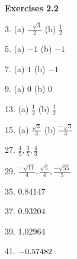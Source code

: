 \textbf{Exercises 2.2} 
\begin{multicols}{2}

3.
(a) $\frac{ -\sqrt{3}}{2}$ (b) $\frac{1}{2}$ 

5. (a) $ -1$ (b) $ -1$ 

7. (a) $1$ (b) $ -1$ 

9. (a) $0$ (b) $0$ 

13. (a) $\frac{1}{2}$ (b) $\frac{1}{2}$ 

15. (a) $\frac{\sqrt{3}}{3}$ (b) $\frac{ -\sqrt{3}}{3}$ 

27. $\frac{4}{5} ,\frac{3}{5} ,\frac{4}{3}$ 

29. $\frac{ -\sqrt{11}}{4} ,\frac{\sqrt{5}}{4} ,\frac{ -\sqrt{55}}{5}$ 

35. $0.84147$ 

37. $0.93204$ 

39. $1.02964$ 

41. $ -0.57482\vspace{+5.000000cm}$ 
\end{multicols}
\clearpage

